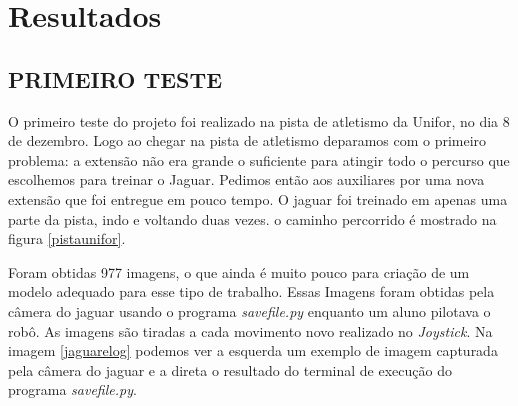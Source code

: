 \chapter{Resultados}

\section{PRIMEIRO TESTE}
\label{primeiro_teste}
O primeiro teste do projeto foi realizado na pista de atletismo da Unifor, no dia 8 de dezembro.
Logo ao chegar na pista de atletismo deparamos com o primeiro problema: a extensão não era grande o suficiente para atingir todo o percurso que escolhemos para treinar o Jaguar. Pedimos então aos auxiliares por uma nova extensão que foi entregue em pouco tempo. O jaguar foi treinado em apenas uma parte da pista, indo e voltando duas vezes. o caminho percorrido é mostrado na figura \ref{pistaunifor}.

	\begin{figure}[H]
		\centering
\end{figure}

Foram obtidas 977 imagens, o que ainda é muito pouco para criação de um modelo adequado para esse tipo de trabalho. Essas Imagens foram obtidas pela câmera do jaguar usando o programa \textit{savefile.py} enquanto um aluno pilotava o robô. As imagens são tiradas a cada movimento novo realizado no \textit{Joystick}. Na imagem \ref{jaguarelog} podemos ver a esquerda um exemplo de imagem capturada pela câmera do jaguar e a direta o resultado do terminal de execução do programa \textit{savefile.py}.

